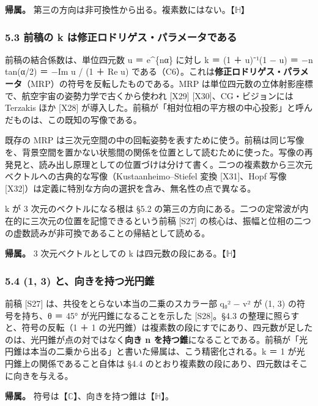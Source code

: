 \documentclass[
  a4paper,
]{ltjsarticle}
\begin{document}
\textbf{帰属。}
第三の方向は非可換性から出る。複素数にはない。【\(\mathbb{H}\)】

\subsubsection{5.3 前稿の k
は修正ロドリゲス・パラメータである}\label{ux524dux7a3fux306e-k-ux306fux4feeux6b63ux30edux30c9ux30eaux30b2ux30b9ux30d1ux30e9ux30e1ux30fcux30bfux3067ux3042ux308b}

前稿の結合係数は、単位四元数 u ＝ e\^{}\{nα\} に対し k ＝ (1 ＋ u)⁻¹(1 −
u) ＝ −n tan(α/2) ＝ −Im u / (1 ＋ Re u)
である（C6）。これは\textbf{修正ロドリゲス・パラメータ}（MRP）の符号を反転したものである。MRP
は単位四元数の立体射影座標で、航空宇宙の姿勢力学で古くから使われ
{[}X29{]} {[}X30{]}、CG・ビジョンには Terzakis ほか {[}X28{]}
が導入した。前稿が「相対位相の平方根の中心投影」と呼んだものは、この既知の写像である。

既存の MRP
は三次元空間の中の回転姿勢を表すために使う。前稿は同じ写像を、背景空間を置かない状態間の関係を位置として読むために使った。写像の再発見と、読み出し原理としての位置づけは分けて書く。二つの複素数から三次元ベクトルへの古典的な写像（Kustaanheimo--Stiefel
変換 {[}X31{]}、Hopf 写像
{[}X32{]}）は定義に特別な方向の選択を含み、無名性の点で異なる。

k が 3 次元のベクトルになる根は §5.2
の第三の方向にある。二つの定常波が内在的に三次元の位置を記憶できるという前稿
{[}S27{]}
の核心は、振幅と位相の二つの虚数読みが非可換であることの帰結として読める。

\textbf{帰属。} 3 次元ベクトルとしての k
は四元数の段にある。【\(\mathbb{H}\)】

\subsubsection{5.4 (1, 3)
と、向きを持つ光円錐}\label{ux3068ux5411ux304dux3092ux6301ux3064ux5149ux5186ux9310}

前稿 {[}S27{]} は、共役をとらない本当の二乗のスカラー部 q₀² −
\textbar v\textbar² が (1, 3) の符号を持ち、θ ＝ 45°
が光円錐になることを示した {[}S28{]}。§4.3
の整理に照らすと、符号の反転（1 ＋ 1
の光円錐）は複素数の段にすでにあり、四元数が足したのは、光円錐が点の対ではなく\textbf{向き
n
を持つ錐}になることである。前稿が「光円錐は本当の二乗から出る」と書いた帰属は、こう精密化される。\textbar k\textbar{}
＝ 1 が光円錐上の関係であること自体は §4.4
のとおり複素数の段にあり、四元数はそこに向きを与える。

\textbf{帰属。}
符号は【\(\mathbb{C}\)】、向きを持つ錐は【\(\mathbb{H}\)】。
\end{document}
